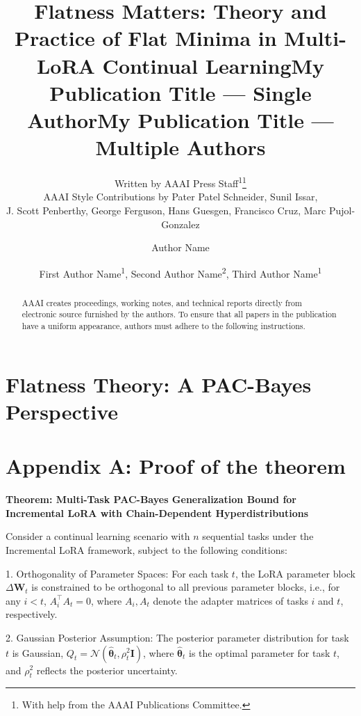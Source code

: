 \documentclass[letterpaper]{article} %
\title{Flatness Matters: Theory and Practice of Flat Minima in Multi-LoRA Continual Learning}
\author{
    Written by AAAI Press Staff\textsuperscript{\rm 1}\thanks{With help from the AAAI Publications Committee.}\\
    AAAI Style Contributions by Pater Patel Schneider,
    Sunil Issar,\\
    J. Scott Penberthy,
    George Ferguson,
    Hans Guesgen,
    Francisco Cruz\equalcontrib,
    Marc Pujol-Gonzalez\equalcontrib
}
\title{My Publication Title --- Single Author}
\author {
    Author Name
}
\title{My Publication Title --- Multiple Authors}
\author {
    First Author Name\textsuperscript{\rm 1},
    Second Author Name\textsuperscript{\rm 2},
    Third Author Name\textsuperscript{\rm 1}
}
\begin{document}
\maketitle

\begin{abstract}
AAAI creates proceedings, working notes, and technical reports directly from electronic source furnished by the authors. To ensure that all papers in the publication have a uniform appearance, authors must adhere to the following instructions.
\end{abstract}



\section{Flatness Theory: A PAC-Bayes Perspective}






\appendix

\section{Appendix A: Proof of the theorem}

\textbf{Theorem: Multi-Task PAC-Bayes Generalization Bound for Incremental LoRA with Chain-Dependent Hyperdistributions}


Consider a continual learning scenario with $n$ sequential tasks under the Incremental LoRA framework, subject to the following conditions:

1. Orthogonality of Parameter Spaces: For each task $t$, the LoRA parameter block $\Delta\mathbf{W}_t$ is constrained to be orthogonal to all previous parameter blocks, i.e., for any $i < t$, $A_i^\top A_t = 0$, where $A_i, A_t$ denote the adapter matrices of tasks $i$ and $t$, respectively.

2. Gaussian Posterior Assumption: The posterior parameter distribution for task $t$ is Gaussian, $Q_t = \mathcal{N}(\hat{\boldsymbol{\theta}}_t, \rho_t^2 \mathbf{I})$, where $\hat{\boldsymbol{\theta}}_t$ is the optimal parameter for task $t$, and $\rho_t^2$ reflects the posterior uncertainty.
\end{document}

